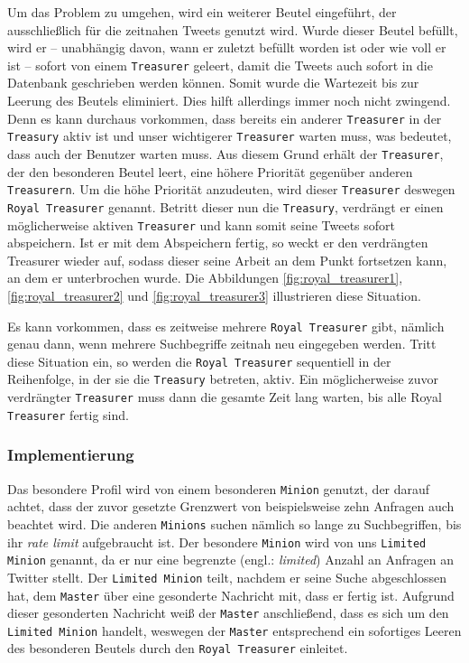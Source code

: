 Um das Problem zu umgehen, wird ein weiterer Beutel eingeführt, der ausschließlich für die zeitnahen Tweets genutzt wird.
Wurde dieser Beutel befüllt, wird er -- unabhängig davon, wann er zuletzt befüllt worden ist oder wie voll er ist -- sofort von einem \texttt{Treasurer} geleert, damit die Tweets auch sofort in die Datenbank geschrieben werden können.
Somit wurde die Wartezeit bis zur Leerung des Beutels eliminiert.
Dies hilft allerdings immer noch nicht zwingend.
Denn es kann durchaus vorkommen, dass bereits ein anderer \texttt{Treasurer} in der \texttt{Treasury} aktiv ist und unser wichtigerer \texttt{Treasurer} warten muss, was bedeutet, dass auch der Benutzer warten muss.
Aus diesem Grund erhält der \texttt{Treasurer}, der den besonderen Beutel leert, eine höhere Priorität gegenüber anderen \texttt{Treasurern}.
Um die höhe Priorität anzudeuten, wird dieser \texttt{Treasurer} deswegen \texttt{Royal Treasurer} genannt.
Betritt dieser nun die \texttt{Treasury}, verdrängt er einen möglicherweise aktiven \texttt{Treasurer} und kann somit seine Tweets sofort abspeichern.
Ist er mit dem Abspeichern fertig, so weckt er den verdrängten Treasurer wieder auf, sodass dieser seine Arbeit an dem Punkt fortsetzen kann, an dem er unterbrochen wurde.
Die Abbildungen \ref{fig:royal_treasurer1}, \ref{fig:royal_treasurer2} und \ref{fig:royal_treasurer3} illustrieren diese Situation.

Es kann vorkommen, dass es zeitweise mehrere \texttt{Royal Treasurer} gibt, nämlich genau dann, wenn mehrere Suchbegriffe zeitnah neu eingegeben werden.
Tritt diese Situation ein, so werden die \texttt{Royal Treasurer} sequentiell in der Reihenfolge, in der sie die \texttt{Treasury} betreten, aktiv.
Ein möglicherweise zuvor verdrängter \texttt{Treasurer} muss dann die gesamte Zeit lang warten, bis alle Royal \texttt{Treasurer} fertig sind.

\subsubsection{Implementierung}

Das besondere Profil wird von einem besonderen \texttt{Minion} genutzt, der darauf achtet, dass der zuvor gesetzte Grenzwert von beispielsweise zehn Anfragen auch beachtet wird.
Die anderen \texttt{Minions} suchen nämlich so lange zu Suchbegriffen, bis ihr \textit{rate limit} aufgebraucht ist.
Der besondere \texttt{Minion} wird von uns \texttt{Limited Minion} genannt, da er nur eine begrenzte (engl.: \textit{limited}) Anzahl an Anfragen an Twitter stellt.
Der \texttt{Limited Minion} teilt, nachdem er seine Suche abgeschlossen hat, dem \texttt{Master} über eine gesonderte Nachricht mit, dass er fertig ist.
Aufgrund dieser gesonderten Nachricht weiß der \texttt{Master} anschließend, dass es sich um den \texttt{Limited Minion} handelt, weswegen der \texttt{Master} entsprechend ein sofortiges Leeren des besonderen Beutels durch den \texttt{Royal Treasurer} einleitet.

